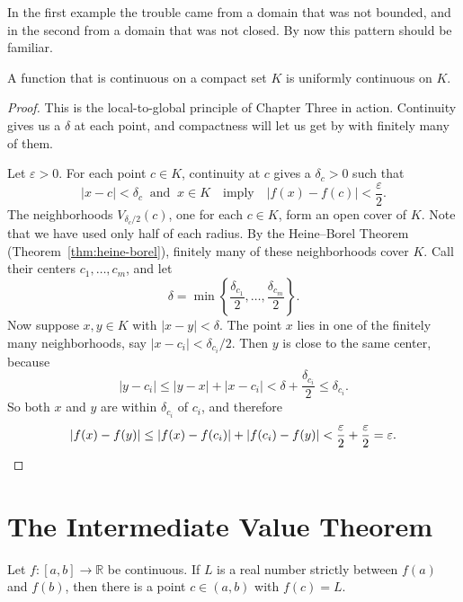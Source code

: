 In the first example the trouble came from a domain that was not bounded, and in the second from a domain that was not closed.  By now this pattern should be familiar.

\begin{theorem}\label{thm:uniform-compact}
A function that is continuous on a compact set $K$ is uniformly continuous on $K$.
\end{theorem}

\begin{proof}
This is the local-to-global principle of Chapter Three in action.  Continuity gives us a $\delta$ at each point, and compactness will let us get by with finitely many of them.

Let $\varepsilon > 0$.  For each point $c \in K$, continuity at $c$ gives a $\delta_c > 0$ such that
\[ |x - c| < \delta_c \ \text{ and } \ x \in K \quad \text{imply} \quad |f(x) - f(c)| < \frac{\varepsilon}{2}. \]
The neighborhoods $V_{\delta_c/2}(c)$, one for each $c \in K$, form an open cover of $K$.  Note that we have used only half of each radius.  By the Heine--Borel Theorem (Theorem~\ref{thm:heine-borel}), finitely many of these neighborhoods cover $K$.  Call their centers $c_1, \ldots, c_m$, and let
\[ \delta = \min\left\{\frac{\delta_{c_1}}{2}, \ldots, \frac{\delta_{c_m}}{2}\right\}. \]
Now suppose $x, y \in K$ with $|x - y| < \delta$.  The point $x$ lies in one of the finitely many neighborhoods, say $|x - c_i| < \delta_{c_i}/2$.  Then $y$ is close to the same center, because
\[ |y - c_i| \leq |y - x| + |x - c_i| < \delta + \frac{\delta_{c_i}}{2} \leq \delta_{c_i}. \]
So both $x$ and $y$ are within $\delta_{c_i}$ of $c_i$, and therefore
\[ |f(x) - f(y)| \leq |f(x) - f(c_i)| + |f(c_i) - f(y)| < \frac{\varepsilon}{2} + \frac{\varepsilon}{2} = \varepsilon. \qedhere \]
\end{proof}


\section{The Intermediate Value Theorem}

\begin{theorem}\label{thm:ivt}
Let $f : [a,b] \to \mathbb{R}$ be continuous.  If $L$ is a real number strictly between $f(a)$ and $f(b)$, then there is a point $c \in (a,b)$ with $f(c) = L$.
\end{theorem}

